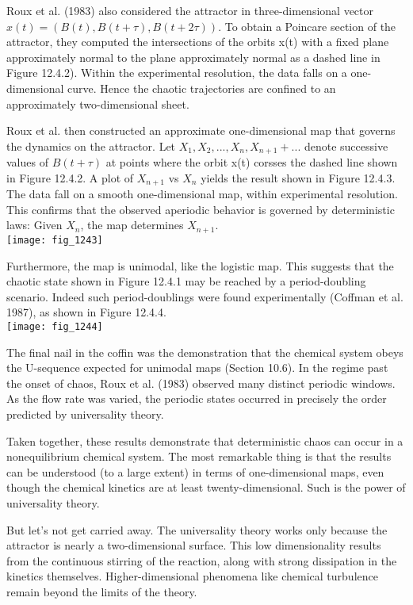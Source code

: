 \documentclass{article}
\newcommand\tab[1][1cm]{\hspace*{#1}}
\begin{document}
Roux et al. (1983) also considered the attractor in three-dimensional vector $x(t)=(B(t),B(t+\tau), B(t+2\tau))$. To obtain a Poincare section of the attractor, they computed the intersections of the orbits x(t) with a fixed plane approximately normal to the plane approximately normal as a dashed line in Figure 12.4.2). Within the experimental resolution, the data falls on a one-dimensional curve. Hence the chaotic trajectories are confined to an approximately two-dimensional sheet. \\ \tab 

Roux et al. then constructed an approximate one-dimensional map that governs the dynamics on the attractor. Let $X_{1},X_{2},...,X_{n},X_{n+1}+...$ denote successive values of $B(t+\tau)$ at points where the orbit x(t) corsses the dashed line shown in Figure 12.4.2. A plot of $X_{n+1}$ vs $X_{n}$ yields the result shown in Figure 12.4.3. The data fall on a smooth one-dimensional map, within experimental resolution. This confirms that the observed aperiodic behavior is governed by deterministic laws: Given $X_{n}$, the map determines $X_{n+1}$. \\ 

\texttt{[image: fig\_1243]}

\tab Furthermore, the map is unimodal, like the logistic map. This suggests that the chaotic state shown in Figure 12.4.1 may be reached by a period-doubling scenario. Indeed such period-doublings were found experimentally (Coffman et al. 1987), as shown in Figure 12.4.4.  \\

\texttt{[image: fig\_1244]} 

\tab The final nail in the coffin was the demonstration that the chemical system obeys the U-sequence expected for unimodal maps (Section 10.6). In the regime past the onset of chaos, Roux et al. (1983) observed many distinct periodic windows. As the flow rate was varied, the periodic states occurred in precisely the order predicted by universality theory. \\ \tab

Taken together, these results demonstrate that deterministic chaos can occur in a nonequilibrium chemical system. The most remarkable thing is that the results can be understood (to a large extent) in terms of one-dimensional maps, even though the chemical kinetics are at least twenty-dimensional. Such is the power of universality theory. \\ \tab

But let's not get carried away. The universality theory works only because the attractor is nearly a two-dimensional surface. This low dimensionality results from the continuous stirring of the reaction, along with strong dissipation in the kinetics themselves. Higher-dimensional phenomena like chemical turbulence remain beyond the limits of the theory. \\
\end{document}
